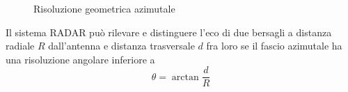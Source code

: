 {
}
\begin{figure}[ht!]\centering
{}\quad{}
\caption{Risoluzione geometrica azimutale}
\end{figure}

Il sistema \ac{RADAR} può rilevare e distinguere l'eco di due bersagli a distanza radiale $R$ dall'antenna e distanza trasversale $d$ fra loro se il fascio azimutale ha una risoluzione angolare inferiore a
\begin{equation}
\theta=\arctan\frac{d}{R}
\end{equation}

